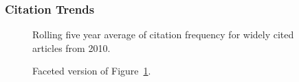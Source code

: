 \documentclass[
  10pt,
  letterpaper,
  DIV=11,
  numbers=noendperiod,
  twoside]{scrartcl}
\begin{document}
\subsubsection*{Citation Trends}\label{citation-trends-34}

\begin{figure}


\caption{\label{fig-citation-spaghetti-2010}Rolling five year average of
citation frequency for widely cited articles from 2010.}

\end{figure}%

\begin{figure}


\caption{\label{fig-citation-facet-2010}Faceted version of
Figure~\ref{fig-citation-spaghetti-2010}.}

\end{figure}%
\end{document}
